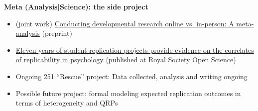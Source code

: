\documentclass[]{article}
\begin{document}
\noindent\textbf{Meta (Analysis|Science): the side project}
\begin{itemize}
	\item (joint work) \href{https://osf.io/preprints/psyarxiv/qc6fw}{Conducting developmental research online vs. in-person: A meta-analysis} (preprint)
	\item \href{https://royalsocietypublishing.org/doi/full/10.1098/rsos.231240}{Eleven years of student replication projects provide evidence on the correlates of replicability in psychology} (published at Royal Society Open Science)
	\item  Ongoing 251 ``Rescue'' project: Data collected, analysis and writing ongoing
	\item Possible future project: formal modeling expected replication outcomes in terms of heterogeneity and QRPs
\end{itemize}
%
%
%

\end{document}
